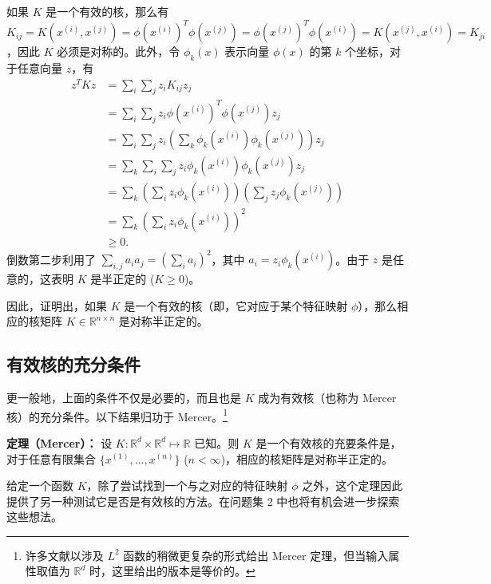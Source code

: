 如果 $K$ 是一个有效的核，那么有 $K_{ij} = K(x^{(i)}, x^{(j)}) = \phi(x^{(i)})^T \phi(x^{(j)}) = \phi(x^{(j)})^T \phi(x^{(i)}) = K(x^{(j)}, x^{(i)}) = K_{ji}$，因此 $K$ 必须是对称的。此外，令 $\phi_k(x)$ 表示向量 $\phi(x)$ 的第 $k$ 个坐标，对于任意向量 $z$，有
\begin{align*} 
    z^T K z &= \sum_i \sum_j z_i K_{ij} z_j \\ 
    &= \sum_i \sum_j z_i \phi(x^{(i)})^T \phi(x^{(j)}) z_j \\ 
    &= \sum_i \sum_j z_i \left( \sum_k \phi_k(x^{(i)}) \phi_k(x^{(j)}) \right) z_j \\ 
    &= \sum_k \sum_i \sum_j z_i \phi_k(x^{(i)}) \phi_k(x^{(j)}) z_j \\ 
    &= \sum_k \left( \sum_i z_i \phi_k(x^{(i)}) \right) \left( \sum_j z_j \phi_k(x^{(j)}) \right) \\ 
    &= \sum_k \left( \sum_i z_i \phi_k(x^{(i)}) \right)^2 \\ 
    &\ge 0. 
\end{align*}
倒数第二步利用了 $\sum_{i,j} a_i a_j = (\sum_i a_i)^2$，其中 $a_i = z_i \phi_k(x^{(i)})$。由于 $z$ 是任意的，这表明 $K$ 是半正定的 ($K \ge 0$)。

因此，证明出，如果 $K$ 是一个有效的核（即，它对应于某个特征映射 $\phi$），那么相应的核矩阵 $K \in \mathbb{R}^{n \times n}$ 是对称半正定的。

\subsection*{有效核的充分条件}

更一般地，上面的条件不仅是必要的，而且也是 $K$ 成为有效核（也称为 Mercer 核）的充分条件。以下结果归功于 Mercer。\footnote{许多文献以涉及 $L^2$ 函数的稍微更复杂的形式给出 Mercer 定理，但当输入属性取值为 $\mathbb{R}^d$ 时，这里给出的版本是等价的。}

\noindent\textbf{定理（Mercer）：} 设 $K: \mathbb{R}^d \times \mathbb{R}^d \mapsto \mathbb{R}$ 已知。则 $K$ 是一个有效核的充要条件是，对于任意有限集合 $\{x^{(1)}, \dots, x^{(n)}\}$ ($n < \infty$)，相应的核矩阵是对称半正定的。

给定一个函数 $K$，除了尝试找到一个与之对应的特征映射 $\phi$ 之外，这个定理因此提供了另一种测试它是否是有效核的方法。在问题集 2 中也将有机会进一步探索这些想法。

